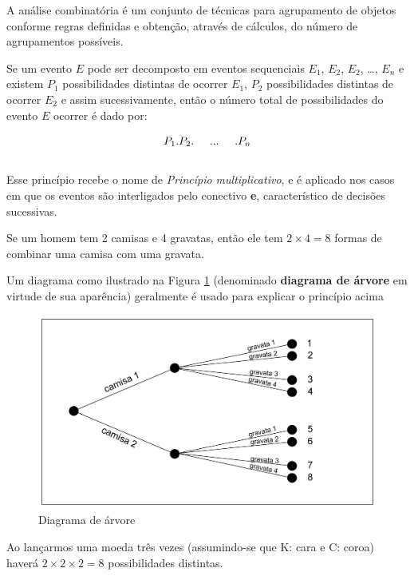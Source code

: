 \documentclass[
]{book}
\begin{document}
\hfill\break

A análise combinatória é um conjunto de técnicas para agrupamento de objetos conforme regras definidas e obtenção, através de cálculos, do número de agrupamentos possíveis.

\hfill\break

Se um evento \(E\) pode ser decomposto em eventos sequenciais \(E_{1}\), \(E_{2}\), \(E_{2}\), \ldots, \(E_{n}\) e existem \(P_{1}\) possibilidades distintas de ocorrer \(E_{1}\), \(P_{2}\) possibilidades distintas de ocorrer \(E_{2}\) e assim sucessivamente, então o número total de possibilidades do evento \(E\) ocorrer é dado por:

\hfill\break

\[
P_{1}.P_{2}. \hspace{0.5cm}... \hspace{0.5cm}.P_{n}
\]\\

Esse princípio recebe o nome de \emph{Princípio multiplicativo}, e é aplicado nos casos em que os eventos são interligados pelo conectivo \textbf{e}, característico de decisões sucessivas.

\hfill\break

Se um homem tem 2 camisas e 4 gravatas, então ele tem \(2 \times 4 = 8\) formas de combinar uma camisa com uma gravata.

\hfill\break

Um diagrama como ilustrado na Figura \ref{fig:fig12} (denominado \textbf{diagrama de árvore} em virtude de sua aparência) geralmente é usado para explicar o princípio acima

\hfill\break

\begin{figure}

{\centering \includegraphics[width=0.5\linewidth]{images4/diagrama_arvore} 

}

\caption{Diagrama de árvore}\label{fig:fig12}
\end{figure}

\hfill\break

Ao lançarmos uma moeda três vezes (assumindo-se que K: cara e C: coroa) haverá \(2 \times 2 \times 2 = 8\) possibilidades distintas.
\end{document}
